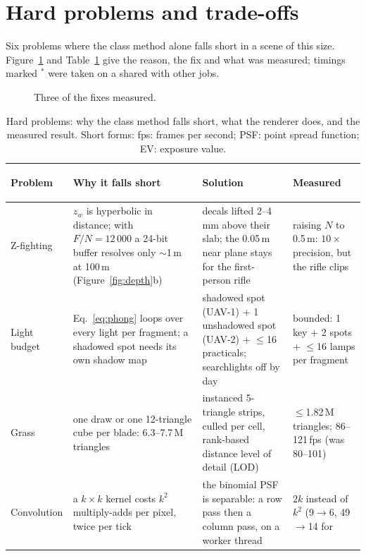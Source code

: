 \section{Hard problems and trade-offs}
\label{sec:hard}
Six problems where the class method alone falls short in a scene of this size. Figure~\ref{fig:fixes} and
Table~\ref{tab:hard} give the reason, the fix and what was measured; timings marked $^\ast$ were taken on a  shared with other jobs.

\begin{figure}[htbp]
\centering
{}
\caption{Three of the fixes measured.}
\label{fig:fixes}
\end{figure}

\begin{table}[htbp]
\caption{Hard problems: why the class method falls short, what the renderer does, and the measured result. Short forms: fps: frames per second; PSF: point spread function; EV: exposure value.}
\label{tab:hard}
\centering\small\setlength{\tabcolsep}{4pt}\renewcommand{\arraystretch}{1.15}
\begin{tabularx}{\linewidth}{@{}>{\bfseries\raggedright\arraybackslash}p{2.2cm}>{\raggedright\arraybackslash}X>{\raggedright\arraybackslash}X>{\raggedright\arraybackslash}p{3.3cm}@{}}
\toprule
\normalfont Problem & Why it falls short & Solution & Measured\\\midrule
Z-fighting & $z_w$ is hyperbolic in distance; with $F/N=12\,000$ a 24-bit buffer resolves only $\sim$1\,m at 100\,m
  (Figure~\ref{fig:depth}b) & decals lifted 2--4\,mm above their slab; the 0.05\,m near plane stays for the
  first-person rifle & raising $N$ to 0.5\,m: $10\times$ precision, but the rifle clips\\
Light budget & Eq.~\eqref{eq:phong} loops over every light per fragment; a shadowed spot needs its own shadow map &
  1 shadowed spot (UAV-1) + 1 unshadowed spot (UAV-2) + $\le$16 practicals; searchlights off by day & bounded:
  1 key + 2 spots + $\le$16 lamps per fragment\\
Grass & one draw or one 12-triangle cube per blade: 6.3--7.7\,M triangles & instanced 5-triangle strips, culled per
  cell, rank-based distance level of detail (LOD) & $\le$1.82\,M triangles; 86--121\,fps (was 80--101)\\
Convolution & a $k\times k$ kernel costs $k^2$ multiply-adds per pixel, twice per tick & the binomial PSF is
  separable: a row pass then a column pass, on a worker thread & $2k$ instead of $k^2$ (9$\to$6, 49$\to$14 for

\end{tabularx}
\end{table}
